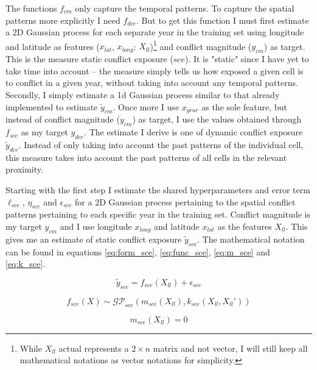 \documentclass[a4paper]{article}
\begin{document}
The functions $f_{cm}$ only capture the temporal patterns. To capture the spatial patterns more explicitly I need $f_{dce}$. But to get this function I must first estimate a 2D Gaussian process for each separate year in the training set using longitude and latitude as features ($x_{lat}$, $x_{long}$: $X_{ll}$)\footnote{While $X_{ll}$ actual represents a $2\times n$ matrix and not vector, I will still keep all mathematical notations as vector notations for simplicity.} and conflict magnitude ($y_{cm}$) as target. This is the measure static conflict exposure ($sce$). It is "static" since I have yet to take time into account -- the measure simply tells us how exposed a given cell is to conflict in a given year, without taking into account any temporal patterns. Secondly, I simply estimate a 1d Gaussian process similar to that already implemented to estimate $\tilde{y}_{cm}$. Once more I use $x_{year}$ as the sole feature, but instead of conflict magnitude ($y_{cm}$) as target, I use the values obtained through $f_{sce}$ as my target $y_{dce}$. The estimate I derive is one of dynamic conflict exposure $\tilde{y}_{dce}$. Instead of only taking into account the past patterns of the individual cell, this measure takes into account the past patterns of all cells in the relevant proximity.\par 

Starting with the first step I estimate the shared hyperparameters and error term $\ell_{sce}$, $\eta_{sce}$ and $\epsilon_{sce}$ for a 2D Gaussian process pertaining to the spatial conflict patterns pertaining to each specific year in the training set. Conflict magnitude is my target $y_{cm}$ and I use longitude $x_{long}$ and latitude $x_{lat}$ as the features $X_{ll}$. This gives me an estimate of static conflict exposure $\tilde{y}_{sce}$. The mathematical notation can be found in equations \ref{eq:form_sce}, \ref{eq:func_sce}, \ref{eq:m_sce} and \ref{eq:k_sce}.\par


\[
\tilde{y}_{sce} = f_{sce}(X_{ll}) + \epsilon_{sce} \tag{23} \label{eq:form_sce}
\]

\[
f_{sce}(X) \sim \mathcal{GP}_{sce}(m_{sce}(X_{ll}),k_{sce}(X_{ll},X_{ll}')) \tag{24} \label{eq:func_sce}
\]

\[
m_{sce}(X_{ll}) = 0 \tag{25} \label{eq:m_sce}
\]
\end{document}
